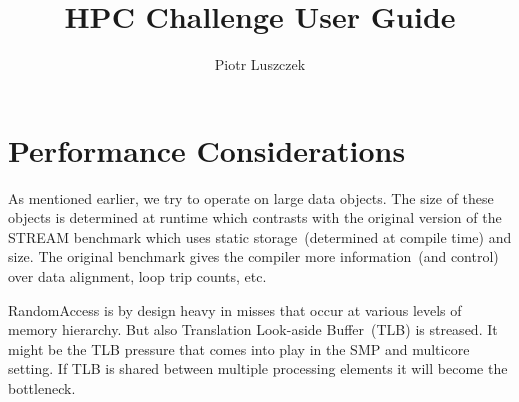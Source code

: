 \documentclass[twocolumn]{report}
\newcommand{\STREAM}{\textsf{STREAM}\xspace}
\newcommand{\RANDA}{\textsf{RandomAccess}\xspace}
\begin{document}
\title{HPC Challenge User Guide}
\author{Piotr Luszczek}
\maketitile

\chapter{Performance Considerations}

As mentioned earlier, we try to operate on large data objects. The
size of these objects is determined at runtime which contrasts with
the original version of the \STREAM benchmark which uses static
storage~(determined at compile time) and size. The original benchmark
gives the compiler more information~(and control) over data alignment,
loop trip counts, etc.

\RANDA is by design heavy in misses that occur at various levels of
memory hierarchy. But also Translation Look-aside Buffer~(TLB) is
streased. It might be the TLB pressure that comes into play in the SMP
and multicore setting. If TLB is shared between multiple processing
elements it will become the bottleneck.
\end{document}
